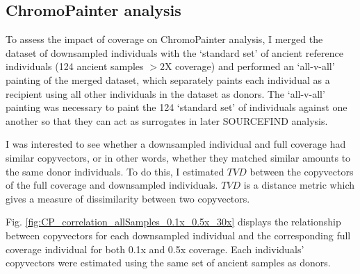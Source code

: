 {\subsection{ChromoPainter analysis} \label{sec:ChromoPainterChap2}

To assess the impact of coverage on ChromoPainter analysis, I merged the dataset of downsampled individuals with the `standard set' of ancient reference individuals (124 ancient samples $>2$X coverage) and performed an `all-v-all' painting of the merged dataset, which separately paints each individual as a recipient using all other individuals in the dataset as donors. The `all-v-all' painting was necessary to paint the 124 `standard set' of individuals against one another so that they can act as surrogates in later SOURCEFIND analysis. 

I was interested to see whether a downsampled individual and full coverage had similar copyvectors, or in other words, whether they matched similar amounts to the same donor individuals. To do this, I estimated $TVD$ between the copyvectors of the full coverage and downsampled individuals. $TVD$ is a distance metric which gives a measure of dissimilarity between two copyvectors.

Fig. \ref{fig:CP_correlation_allSamples_0.1x_0.5x_30x} displays the relationship between copyvectors for each downsampled individual and the corresponding full coverage individual for both 0.1x and 0.5x coverage. Each individuals' copyvectors were estimated using the same set of ancient samples as donors.

}
